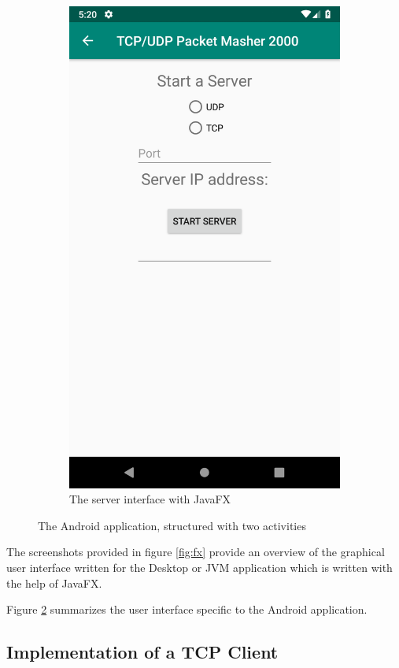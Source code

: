 \begin{figure}[H]
\begin{subfigure}{.49\textwidth}
		\includegraphics[width=0.75\linewidth]{images/task1/serverAndroid.png}
		\caption{The server interface with JavaFX}
		\label{fig:serverAndroid}
	\end{subfigure}
	\caption{The Android application, structured with two activities}
	\label{fig:android}
\end{figure}

The screenshots provided in figure \ref{fig:fx} provide an overview of the graphical user interface written for the Desktop or JVM application which  is written with the help of JavaFX. 

Figure \ref{fig:android} summarizes the user interface specific to the Android application. 



\subsection{Implementation of a TCP Client}

